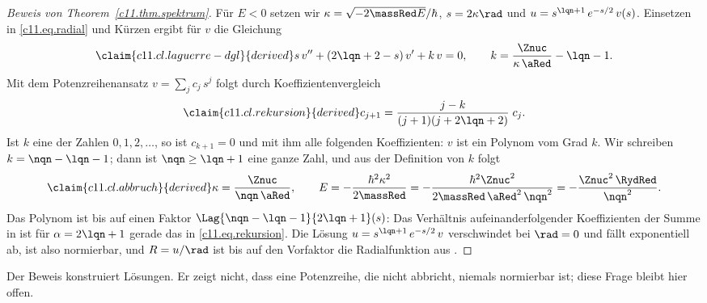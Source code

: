 \begin{vertiefung}
  \begin{proof}[Beweis von Theorem~\ref{c11.thm.spektrum}]
    Für $E < 0$ setzen wir $\kappa = \sqrt{-2\massRed E}/\hbar$, $s = 2\kappa\rad$ und
    $u = s^{\lqn + 1}\,e^{-s/2}\,v(s)$. Einsetzen in \eqref{c11.eq.radial} und Kürzen
    ergibt für $v$ die Gleichung
    \begin{equation}\label{c11.eq.laguerre-dgl}\claim{c11.cl.laguerre-dgl}{derived}
      s\,v'' + (2\lqn + 2 - s)\,v' + k\,v = 0,
      \qquad
      k = \frac{\Znuc}{\kappa\,\aRed} - \lqn - 1 .
    \end{equation}
    Mit dem Potenzreihenansatz $v = \sum_j c_j\,s^j$ folgt durch Koeffizientenvergleich
    \begin{equation}\label{c11.eq.rekursion}\claim{c11.cl.rekursion}{derived}
      c_{j + 1} = \frac{j - k}{(j + 1)(j + 2\lqn + 2)}\;c_j .
    \end{equation}
    Ist $k$ eine der Zahlen $0, 1, 2, \ldots$, so ist $c_{k + 1} = 0$ und mit ihm alle
    folgenden Koeffizienten: $v$ ist ein Polynom vom Grad $k$. Wir schreiben
    $k = \nqn - \lqn - 1$; dann ist $\nqn \geq \lqn + 1$ eine ganze Zahl, und aus der
    Definition von $k$ folgt
    \begin{equation}\label{c11.eq.abbruch}\claim{c11.cl.abbruch}{derived}
      \kappa = \frac{\Znuc}{\nqn\,\aRed},
      \qquad
      E = -\frac{\hbar^2\kappa^2}{2\massRed}
        = -\frac{\hbar^2\Znuc^2}{2\massRed\,\aRed^2\,\nqn^2}
        = -\frac{\Znuc^2\,\RydRed}{\nqn^2} .
    \end{equation}
    Das Polynom ist bis auf einen Faktor $\Lag{\nqn - \lqn - 1}{2\lqn + 1}(s)$: Das
    Verhältnis aufeinanderfolgender Koeffizienten der Summe in  ist für
    $\alpha = 2\lqn + 1$ gerade das in \eqref{c11.eq.rekursion}. Die Lösung
    $u = s^{\lqn + 1}\,e^{-s/2}\,v$ verschwindet bei $\rad = 0$ und fällt exponentiell
    ab, ist also normierbar, und $R = u/\rad$ ist bis auf den Vorfaktor die
    Radialfunktion aus .
  \end{proof}

  Der Beweis konstruiert Lösungen. Er zeigt nicht, dass eine Potenzreihe, die nicht
  abbricht, niemals normierbar ist; diese Frage bleibt hier offen.


\end{vertiefung}
